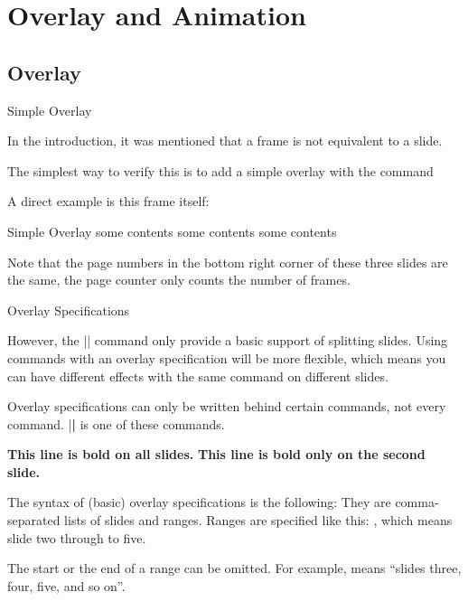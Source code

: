 \section{Overlay and Animation}

\subsection{Overlay}

\begin{fragileframe}{Simple Overlay}

In the introduction, it was mentioned that a frame is not equivalent to a slide. \medskip

\pause

The simplest way to verify this is to add a simple overlay with the command

\begin{command}
\begin{LCL}
\pause
\end{LCL}
\end{command}

\pause

A direct example is this frame itself:
\begin{example}
\begin{LCL}
\begin{frame}{Simple Overlay}
  some contents
  \pause
  some contents
  \pause
  some contents
\end{frame}
\end{LCL}
\end{example}

Note that the page numbers in the bottom right corner of these three slides are the same, the page counter only counts the number of frames.

\end{fragileframe}

\begin{fragileframe}{Overlay Specifications}

However, the \LC|\pause| command only provide a basic support of splitting slides. Using commands with an overlay specification will be more flexible, which means you can have different effects with the same command on different slides. \medskip

Overlay specifications can only be written behind certain commands, not every command. \LC|\textbf| is one of these commands.

\begin{latexexample}
\textbf{This line is bold on all slides.}
\textbf<2>{This line is bold only on the second slide.}
\end{latexexample}

The syntax of (basic) overlay specifications is the following: They are comma-separated lists of slides and
ranges. Ranges are specified like this: , which means slide two through to five. \medskip

The start or the end of a range can be omitted. For example,  means ``slides three, four, five, and so on''.

\end{fragileframe}



